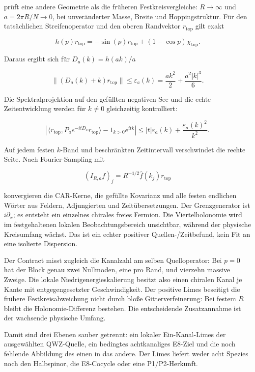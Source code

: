  prüft eine andere Geometrie als die früheren
Festkreisvergleiche: \(R\to\infty\) und \(a=2\pi R/N\to0\), bei unveränderter
Masse, Breite und Hoppingstruktur. Für den tatsächlichen Streifenoperator und
den oberen Randvektor \(r_\mathrm{top}\) gilt exakt

\[
 h(p)r_\mathrm{top}=-\sin(p)r_\mathrm{top}+(1-\cos p)\chi_\mathrm{top}.
\]

Daraus ergibt sich für \(D_a(k)=h(ak)/a\)

\[
 \|(D_a(k)+k)r_\mathrm{top}\|
 \le \varepsilon_a(k)
 =\frac{a k^2}{2}+\frac{a^2|k|^3}{6}.
\]

Die Spektralprojektion auf den gefüllten negativen See und die echte
Zeitentwicklung werden für $k\ne0$ gleichzeitig kontrolliert:

\[
 \left|\langle r_\mathrm{top},P_a e^{-itD_a}r_\mathrm{top}\rangle
 -1_{k>0}e^{itk}\right|
 \le |t|\varepsilon_a(k)+\frac{\varepsilon_a(k)^2}{k^2}.
\]

Auf jedem festen \(k\)-Band und beschränkten Zeitintervall verschwindet die
rechte Seite. Nach Fourier-Sampling mit

\[
 (I_{R,a}f)_j=R^{-1/2}\widehat f(k_j)r_\mathrm{top}
\]

konvergieren die CAR-Kerne, die gefüllte Kovarianz und alle festen endlichen
Wörter aus Feldern, Adjungierten und Zeitübersetzungen. Der Grenzgenerator ist
\(i\partial_x\); es entsteht ein einzelnes chirales freies Fermion. Die
Viertelholonomie wird im festgehaltenen lokalen Beobachtungsbereich unsichtbar, während der physische Kreisumfang wächst. Das ist ein echter positiver Quellen-/Zeitbefund,
kein Fit an eine isolierte Dispersion.

Der Contract misst zugleich die Kanalzahl am selben Quelloperator: Bei
$p=0$ hat der Block genau zwei Nullmoden, eine pro Rand, und vierzehn
massive Zweige. Die lokale Niedrigenergieskalierung besitzt also einen
chiralen Kanal je Kante mit entgegengesetzter Geschwindigkeit. Der positive
Limes beseitigt die frühere Festkreisabweichung nicht durch bloße
Gitterverfeinerung: Bei festem \(R\) bleibt die Holonomie-Differenz bestehen.
Die entscheidende Zusatzannahme ist der wachsende physische Umfang.

Damit sind drei Ebenen sauber getrennt: ein lokaler Ein-Kanal-Limes der
ausgewählten QWZ-Quelle, ein bedingtes achtkanaliges E8-Ziel und die noch
fehlende Abbildung des einen in das andere. Der Limes liefert weder acht
Spezies noch den Halbspinor, die E8-Cocycle oder eine P1/P2-Herkunft.


